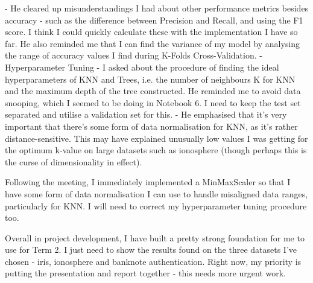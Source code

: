 \documentclass[letterpaper,10pt]{article}
\begin{document}
\begin{markdown}
- He cleared up misunderstandings I had about other performance metrics besides accuracy - such as the difference between Precision and Recall, and using the F1 score. I think I could quickly calculate these with the implementation I have so far. He also reminded me that I can find the variance of my model by analysing the range of accuracy values I find during K-Folds Cross-Validation.  
- Hyperparameter Tuning - I asked about the procedure of finding the ideal hyperparameters of KNN and Trees, i.e. the number of neighbours K for KNN and the maximum depth of the tree constructed. He reminded me to avoid data snooping, which I seemed to be doing in Notebook 6. I need to keep the test set separated and utilise a validation set for this.  
- He emphasised that it's very important that there's some form of data normalisation for KNN, as it's rather distance-sensitive. This may have explained unusually low values I was getting for the optimum k-value on large datasets such as ionosphere (though perhaps this is the curse of dimensionality in effect).  
  
Following the meeting, I immediately implemented a MinMaxScaler so that I have some form of data normalisation I can use to handle misaligned data ranges, particularly for KNN. I will need to correct my hyperparameter tuning procedure too.  

Overall in project development, I have built a pretty strong foundation for me to use for Term 2. I just need to show the results found on the three datasets I've chosen - iris, ionosphere and banknote authentication.  
Right now, my priority is putting the presentation and report together - this needs more urgent work. 
\end{markdown}
\end{document}
